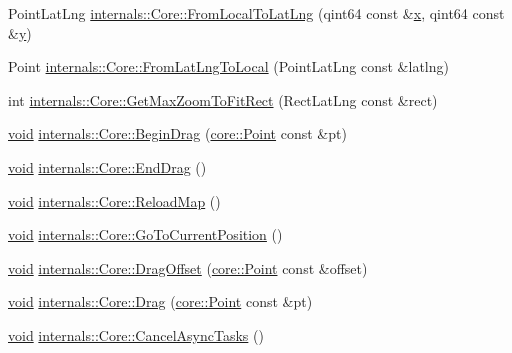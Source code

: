 \begin{DoxyCompactItemize}
\item 
\-Point\-Lat\-Lng \hyperlink{group___o_p_map_widget_gad6344ac56cefc8976c5bdf521b337a2f}{internals\-::\-Core\-::\-From\-Local\-To\-Lat\-Lng} (qint64 const \&\hyperlink{_o_p_plots_8m_a9336ebf25087d91c818ee6e9ec29f8c1}{x}, qint64 const \&\hyperlink{_o_p_plots_8m_a2fb1c5cf58867b5bbc9a1b145a86f3a0}{y})
\item 
\-Point \hyperlink{group___o_p_map_widget_ga8a2cc04c6bd69c306eaebe3df205f919}{internals\-::\-Core\-::\-From\-Lat\-Lng\-To\-Local} (\-Point\-Lat\-Lng const \&latlng)
\item 
int \hyperlink{group___o_p_map_widget_gaa75d239e869570eef0224e4e5654bd75}{internals\-::\-Core\-::\-Get\-Max\-Zoom\-To\-Fit\-Rect} (\-Rect\-Lat\-Lng const \&rect)
\item 
\hyperlink{group___u_a_v_objects_plugin_ga444cf2ff3f0ecbe028adce838d373f5c}{void} \hyperlink{group___o_p_map_widget_ga1255054a69438d905b49b903627aef03}{internals\-::\-Core\-::\-Begin\-Drag} (\hyperlink{structcore_1_1_point}{core\-::\-Point} const \&pt)
\item 
\hyperlink{group___u_a_v_objects_plugin_ga444cf2ff3f0ecbe028adce838d373f5c}{void} \hyperlink{group___o_p_map_widget_ga47086f4344e201cc216384fb3acec854}{internals\-::\-Core\-::\-End\-Drag} ()
\item 
\hyperlink{group___u_a_v_objects_plugin_ga444cf2ff3f0ecbe028adce838d373f5c}{void} \hyperlink{group___o_p_map_widget_ga0ca3f365c1668226a6788084d56a6c1d}{internals\-::\-Core\-::\-Reload\-Map} ()
\item 
\hyperlink{group___u_a_v_objects_plugin_ga444cf2ff3f0ecbe028adce838d373f5c}{void} \hyperlink{group___o_p_map_widget_ga868496601dff669c0a6844a27f41e5c7}{internals\-::\-Core\-::\-Go\-To\-Current\-Position} ()
\item 
\hyperlink{group___u_a_v_objects_plugin_ga444cf2ff3f0ecbe028adce838d373f5c}{void} \hyperlink{group___o_p_map_widget_ga87303856077d440b36aa4b53a5103d64}{internals\-::\-Core\-::\-Drag\-Offset} (\hyperlink{structcore_1_1_point}{core\-::\-Point} const \&offset)
\item 
\hyperlink{group___u_a_v_objects_plugin_ga444cf2ff3f0ecbe028adce838d373f5c}{void} \hyperlink{group___o_p_map_widget_gaf302579c11ad5c2448be76ada0b19bf5}{internals\-::\-Core\-::\-Drag} (\hyperlink{structcore_1_1_point}{core\-::\-Point} const \&pt)
\item 
\hyperlink{group___u_a_v_objects_plugin_ga444cf2ff3f0ecbe028adce838d373f5c}{void} \hyperlink{group___o_p_map_widget_gab37e2ea3b3bb0c794bb9abdf84ac5b5d}{internals\-::\-Core\-::\-Cancel\-Async\-Tasks} ()

\end{DoxyCompactItemize}
